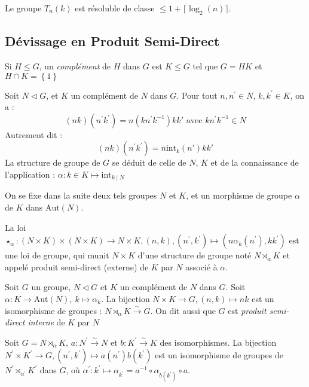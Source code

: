 \documentclass{cours}
\begin{document}
\begin{proposition}
    Le groupe $T_{n}(k)$ est résoluble de classe $\leq 1 + \lceil \log_{2}(n) \rceil$.
\end{proposition}

\subsection{Dévissage en Produit Semi-Direct}
\begin{definition}
    Si $H \leq G$, un \emph{complément} de $H$ dans $G$ est $K\leq G$ tel que $G = HK$ et $H \cap K = \left\{1\right\}$
\end{definition}

\begin{remark}
    Soit $N \lhd G$, et $K$ un complément de $N$ dans $G$. Pour tout $n, n^{'} \in N$, $k, k^{'} \in K$, on a : 
    \[
        (nk)(n^{'}k^{'}) = n(kn^{'}k^{-1})kk' \text{ avec } kn^{'}k^{-1} \in N
    \]
    Autrement dit : 
    \[
        (nk)(n^{'}k^{'}) = n\text{int}_{k}(n')kk'
    \]
    La structure de groupe de $G$ se déduit de celle de $N$, $K$ et de la connaissance de l'application : $\alpha : k \in K \mapsto \text{int}_{k\mid N}$
\end{remark}

On se fixe dans la suite deux tels groupes $N$ et $K$, et un morphisme de groupe $\alpha$ de $K$ dans $\text{Aut}(N)$.

\begin{definition}
    La loi $\star_{\alpha} : (N \times K) \times (N \times K) \rightarrow N \times K, (n, k), (n^{'}, k^{'}) \mapsto (n\alpha_{k}(n^{'}), kk^{'})$ est une loi de groupe, qui munit $N \times K$ d'une structure de groupe noté $N \rtimes_{\alpha} K$ et appelé produit semi-direct (externe) de $K$ par $N$ associé à $\alpha$.
\end{definition}

\begin{proposition}
    Soit $G$ un groupe, $N \lhd G$ et $K$ un complément de $N$ dans $G$. Soit $\alpha : K \rightarrow \text{Aut}(N),\ k \mapsto \alpha_{k}$. La bijection $N \times K \rightarrow G, (n, k) \mapsto nk$ est un isomorphisme de groupes : $N \rtimes_{\alpha} K \xrightarrow{\sim} G$. On dit aussi que $G$ est \emph{produit semi-direct interne} de $K$ par $N$
\end{proposition}

\begin{proposition}
    Soit $G = N \rtimes_{\alpha} K$, $a : N^{'} \xrightarrow{\sim} N$ et $b : K^{'} \xrightarrow{\sim} K$ des isomorphismes. La bijection $N^{'}\times K^{'} \rightarrow G, (n^{'}, k^{'}) \mapsto a(n^{'})b(k^{'})$ est un isomorphisme de groupes de $N^{'} \rtimes_{\alpha^{'}} K^{'}$ dans $G$, où $\alpha^{'} : k^{'} \mapsto \alpha_{k^{'}} = a^{-1}\circ \alpha_{b(k^{'})} \circ a$.
\end{proposition}
\end{document}

